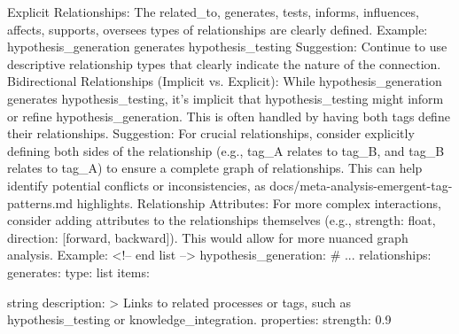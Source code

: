 Explicit Relationships: The related_to, generates, tests, informs, influences, affects, supports, oversees types of relationships are clearly defined.
Example: hypothesis_generation generates hypothesis_testing
Suggestion: Continue to use descriptive relationship types that clearly indicate the nature of the connection.
Bidirectional Relationships (Implicit vs. Explicit): While hypothesis_generation generates hypothesis_testing, it's implicit that hypothesis_testing might inform or refine hypothesis_generation. This is often handled by having both tags define their relationships.
Suggestion: For crucial relationships, consider explicitly defining both sides of the relationship (e.g., tag_A relates to tag_B, and tag_B relates to tag_A) to ensure a complete graph of relationships. This can help identify potential conflicts or inconsistencies, as docs/meta-analysis-emergent-tag-patterns.md highlights.
Relationship Attributes: For more complex interactions, consider adding attributes to the relationships themselves (e.g., strength: float, direction: [forward, backward]). This would allow for more nuanced graph analysis.
Example:
<!-- end list -->
hypothesis_generation:
# ...
relationships:
generates:
 type: list
 items:

string description: > Links to related processes or tags, such as hypothesis_testing or knowledge_integration. properties: strength: 0.9

